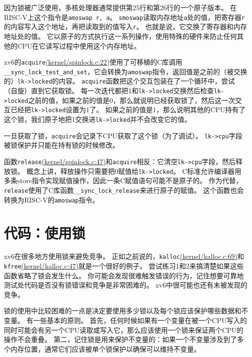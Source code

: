 因为锁被广泛使用，多核处理器通常提供第25行和第26行的一个原子版本。
在RISC-V上这个指令是\texttt{amoswap r, a}。
\texttt{smoswap}读取内存地址\texttt{a}处的值，把寄存器\texttt{r}的内容写入这个地址，再把读取到的值写入\texttt{r}。
也就是说，它交换了寄存器和内存地址处的值。
它以原子的方式执行这一系列操作，使用特殊的硬件来防止任何其他的CPU在它读写过程中使用这个内存地址。

xv6的\texttt{acquire}\href{https://github.com/mit-pdos/xv6-riscv/blob/risc/kernel/spinlock.c#L22}{(kernel/spinlock.c:22)}使用了可移植的C库调用\texttt{\_\_sync\_lock\_test\_and\_set}，它会转换为\texttt{amoswap}指令，返回值是之前的（被交换的）\texttt{lk->locked}的内容。
\texttt{acquire}函数把这个交互包装在了一个循环中，尝试（自旋）直到它获取锁。
每一次迭代都把1和\texttt{lk->locked}交换然后检查\texttt{lk->locked}之前的值，如果之前的值是0，那么就说明已经获取锁了，然后这一次交互已经把\texttt{lk->locked}设置为1了。
如果之前的值是1，那么说明其他的CPU持有了这个锁，我们原子地把1交换进\texttt{lk->locked}并不会改变它的值。

一旦获取了锁，\texttt{acquire}会记录下CPU获取了这个锁（为了调试）。
\texttt{lk->cpu}字段被锁保护并只能在持有锁的时候修改。

函数\texttt{release}\href{https://github.com/mit-pdos/xv6-riscv/blob/risc/kernel/spinlock.c#L47}{(kernel/spinlock.c:47)}和\texttt{acquire}相反：它清空\texttt{lk->cpu}字段，然后释放锁。
概念上讲，释放操作只需要把0赋值给\texttt{lk->locked}。
C标准允许编译器用多条store指令实现赋值操作，因此一条C赋值语句可能不是原子的。
作为代替，\texttt{release}使用了C库函数\texttt{\_\_sync\_lock\_release}来进行原子的赋值。
这个函数也会转换为RISC-V的\texttt{amoswap}指令。

\section{代码：使用锁}
xv6在很多地方使用锁来避免竞争。
正如之前说的，\texttt{kalloc}\href{https://github.com/mit-pdos/xv6-riscv/blob/risc/kernel/kalloc.c#L69}{(kernel/kalloc.c:69)}和\texttt{kfree}\href{https://github.com/mit-pdos/xv6-riscv/blob/risc/kernel/kalloc.c#L47}{(kernel/kalloc.c:47)}就是一个很好的例子。
尝试练习1和2来搞清楚如果这些函数省略了锁会发生什么。
你可能会发现很难触发错误的行为，记住想要可靠地测试处代码是否没有锁错误和竞争是非常困难的。
xv6中很可能也还有未被发现的竞争。

锁的使用中比较困难的一点是决定要使用多少锁以及每个锁应该保护哪些数据和不变量。
有一些基本的原则。
首先，任何时候如果有一个变量在被一个CPU写入的同时可能会有另一个CPU读取或写入它，那么应该使用一个锁来保证两个CPU的操作不会重叠。
第二，记住锁是用来保护不变量的：如果一个不变量涉及到了多个内存位置，通常它们应该被单个锁保护以确保可以维持不变量。

